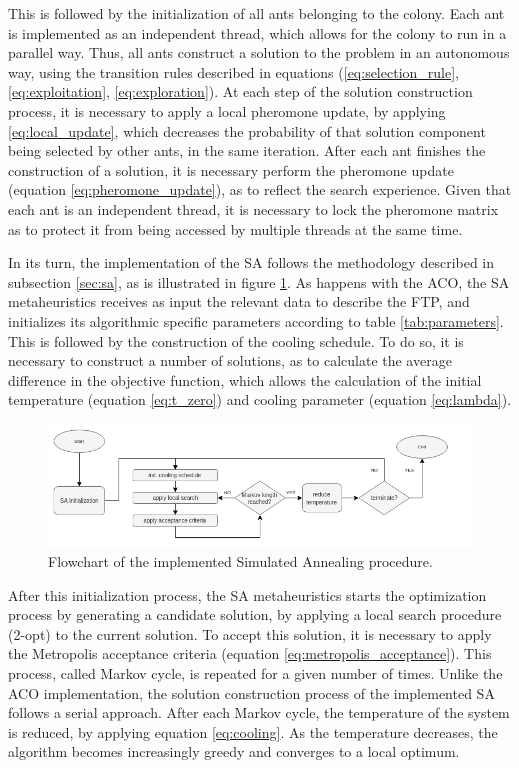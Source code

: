 This is followed by the initialization of all ants belonging to the colony. Each ant is implemented as an independent thread, which allows for the colony to run in a parallel way. Thus, all ants construct a solution to the problem in an autonomous way, using the transition rules described in equations (\ref{eq:selection_rule}, \ref{eq:exploitation}, \ref{eq:exploration}). At each step of the solution construction process, it is necessary to apply a local pheromone update, by applying \ref{eq:local_update}, which decreases the probability of that solution component being selected by other ants, in the same iteration. After each ant finishes the construction of a solution, it is necessary perform the pheromone update (equation \ref{eq:pheromone_update}), as to reflect the search experience. Given that each ant is an independent thread, it is necessary to lock the pheromone matrix as to protect it from being accessed by multiple threads at the same time.

In its turn, the implementation of the SA follows the methodology described in subsection \ref{sec:sa}, as is illustrated in figure \ref{fig:sa_flow}. As happens with the ACO, the SA metaheuristics receives as input the relevant data to describe the FTP, and initializes its algorithmic specific parameters according to table \ref{tab:parameters}. This is followed by the construction of the cooling schedule. To do so, it is necessary to construct a number of solutions, as to calculate the average difference in the objective function, which allows the calculation of the initial temperature (equation \ref{eq:t_zero}) and cooling parameter (equation \ref{eq:lambda}). 

\begin{figure}[h]
  \centering
  \includegraphics[width=\textwidth]{./Figures/system_implementation/sa_flow.png}
  \caption{Flowchart of the implemented Simulated Annealing procedure.}
  \label{fig:sa_flow}  
\end{figure}

After this initialization process, the SA metaheuristics starts the optimization process by generating a candidate solution, by applying a local search procedure (2-opt) to the current solution. To accept this solution, it is necessary to apply the Metropolis acceptance criteria (equation \ref{eq:metropolis_acceptance}). This process, called Markov cycle, is repeated for a given number of times. Unlike the ACO implementation, the solution construction process of the implemented SA follows a serial approach. After each Markov cycle, the temperature of the system is reduced, by applying equation \ref{eq:cooling}. As the temperature decreases, the algorithm becomes increasingly greedy and converges to a local optimum.

